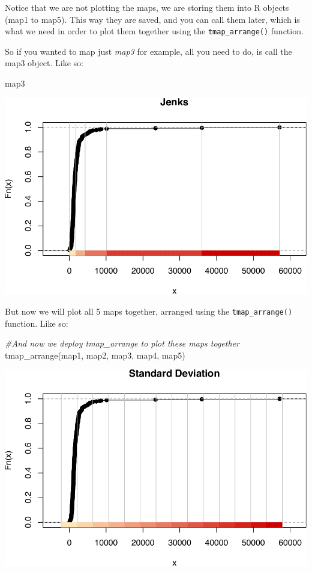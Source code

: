 \documentclass[
]{book}
\newenvironment{Shaded}{\begin{snugshade}}{\end{snugshade}}
\newcommand{\CommentTok}[1]{\textcolor[rgb]{0.56,0.35,0.01}{\textit{#1}}}
\newcommand{\FunctionTok}[1]{\textcolor[rgb]{0.00,0.00,0.00}{#1}}
\newcommand{\NormalTok}[1]{#1}
\begin{document}
Notice that we are not plotting the maps, we are storing them into R objects (map1 to map5). This way they are saved, and you can call them later, which is what we need in order to plot them together using the \texttt{tmap\_arrange()} function.

So if you wanted to map just \emph{map3} for example, all you need to do, is call the map3 object. Like so:

\begin{Shaded}
\begin{Highlighting}[]
\NormalTok{map3}
\end{Highlighting}
\end{Shaded}

\includegraphics{crime_mapping_files/figure-latex/unnamed-chunk-92-1.pdf}

But now we will plot all 5 maps together, arranged using the \texttt{tmap\_arrange()} function. Like so:

\begin{Shaded}
\begin{Highlighting}[]
\CommentTok{\#And now we deploy tmap\_arrange to plot these maps together}
\FunctionTok{tmap\_arrange}\NormalTok{(map1, map2, map3, map4, map5) }
\end{Highlighting}
\end{Shaded}

\includegraphics{crime_mapping_files/figure-latex/unnamed-chunk-93-1.pdf}
\end{document}
